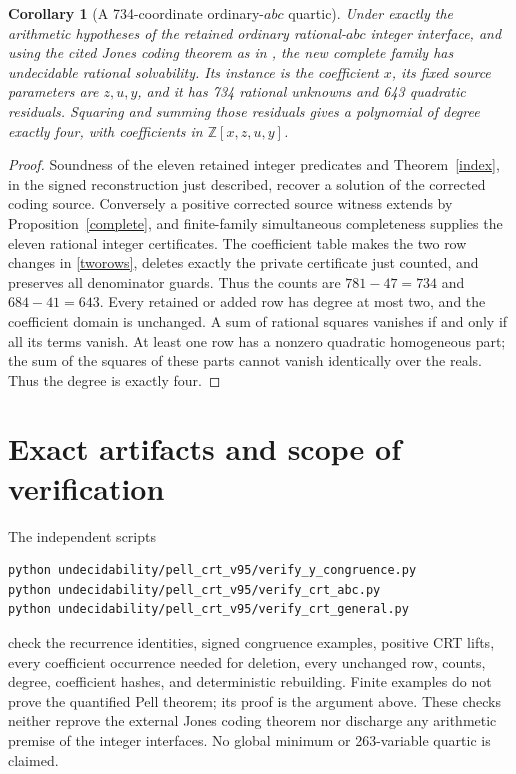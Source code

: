 \documentclass[11pt]{article}
\newtheorem{corollary}[theorem]{Corollary}
\newcommand{\Z}{\mathbb Z}\newcommand{\Q}{\mathbb Q}
\begin{document}
\begin{corollary}[A 734-coordinate ordinary-\(abc\) quartic]\label{abc}
Under exactly the arithmetic hypotheses of the retained ordinary
rational-\(abc\) integer interface, and using the cited Jones coding
theorem as in \cite{Corrected}, the new complete family has
undecidable rational solvability. Its instance is the coefficient
\(x\), its fixed source parameters are \(z,u,y\), and it has
734 rational unknowns and 643 quadratic residuals.
Squaring and summing those residuals gives a polynomial of degree
exactly four, with coefficients in \(\Z[x,z,u,y]\).
\end{corollary}
\begin{proof}
Soundness of the eleven retained integer predicates and
Theorem~\ref{index}, in the signed reconstruction just described,
recover a solution of the corrected coding source. Conversely a
positive corrected source witness extends by
Proposition~\ref{complete}, and finite-family simultaneous
completeness supplies the eleven rational integer certificates.
The coefficient table makes the two row changes in \eqref{tworows},
deletes exactly the private certificate just counted, and preserves
all denominator guards. Thus the counts are
\(781-47=734\) and \(684-41=643\). Every retained or added row
has degree at most two, and the coefficient domain is unchanged.
A sum of rational squares vanishes if and only if all its terms
vanish. At least one row has a nonzero quadratic homogeneous part;
the sum of the squares of these parts cannot vanish identically over
the reals. Thus the degree is exactly four.
\end{proof}



\section{Exact artifacts and scope of verification}

The independent scripts
\begin{verbatim}
python undecidability/pell_crt_v95/verify_y_congruence.py
python undecidability/pell_crt_v95/verify_crt_abc.py
python undecidability/pell_crt_v95/verify_crt_general.py
\end{verbatim}
check the recurrence identities, signed congruence examples, positive
CRT lifts, every coefficient occurrence needed for deletion, every
unchanged row, counts, degree, coefficient hashes, and deterministic
rebuilding. Finite examples do not prove the quantified Pell theorem;
its proof is the argument above. These checks neither reprove the
external Jones coding theorem nor discharge any arithmetic premise
of the integer interfaces. No global minimum or 263-variable quartic
is claimed.
\end{document}
